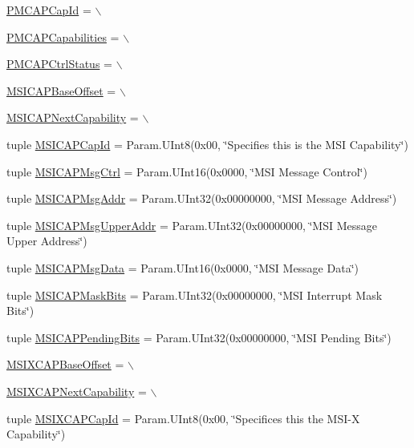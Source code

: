 \begin{DoxyCompactItemize}
\item 
\hyperlink{classPci_1_1PciDevice_a50cb70d7c57b998cb8197e3bdd838ba9}{PMCAPCapId} = $\backslash$
\item 
\hyperlink{classPci_1_1PciDevice_a8cd41ed12be15607f8e7662eb8d84ed6}{PMCAPCapabilities} = $\backslash$
\item 
\hyperlink{classPci_1_1PciDevice_a92b7f127f47b21d3ecc104d25671cf92}{PMCAPCtrlStatus} = $\backslash$
\item 
\hyperlink{classPci_1_1PciDevice_a24a1a0fd62afea203b5edac13b589797}{MSICAPBaseOffset} = $\backslash$
\item 
\hyperlink{classPci_1_1PciDevice_a4f1b67a85cdaf32ce2e152793bcae158}{MSICAPNextCapability} = $\backslash$
\item 
tuple \hyperlink{classPci_1_1PciDevice_a473ff2506f8dde521c6814195db00965}{MSICAPCapId} = Param.UInt8(0x00, \char`\"{}Specifies this is the MSI Capability\char`\"{})
\item 
tuple \hyperlink{classPci_1_1PciDevice_a8e794db7345ad700d23b46e9b7b7adcf}{MSICAPMsgCtrl} = Param.UInt16(0x0000, \char`\"{}MSI Message Control\char`\"{})
\item 
tuple \hyperlink{classPci_1_1PciDevice_ab1a9538764c92af9e4b58fa1889c816a}{MSICAPMsgAddr} = Param.UInt32(0x00000000, \char`\"{}MSI Message Address\char`\"{})
\item 
tuple \hyperlink{classPci_1_1PciDevice_aad615796a9eb2e4f0a7b23a6de466f5a}{MSICAPMsgUpperAddr} = Param.UInt32(0x00000000, \char`\"{}MSI Message Upper Address\char`\"{})
\item 
tuple \hyperlink{classPci_1_1PciDevice_aeb2bb99ab6d72270f3767fa2aa4dd4a5}{MSICAPMsgData} = Param.UInt16(0x0000, \char`\"{}MSI Message Data\char`\"{})
\item 
tuple \hyperlink{classPci_1_1PciDevice_ac70a7d07fb7c0b750913e1d74fb9edf8}{MSICAPMaskBits} = Param.UInt32(0x00000000, \char`\"{}MSI Interrupt Mask Bits\char`\"{})
\item 
tuple \hyperlink{classPci_1_1PciDevice_a1e551eca59d7e257c765befbfd09f569}{MSICAPPendingBits} = Param.UInt32(0x00000000, \char`\"{}MSI Pending Bits\char`\"{})
\item 
\hyperlink{classPci_1_1PciDevice_a07a507adc2b79cf78adec9662343f0fe}{MSIXCAPBaseOffset} = $\backslash$
\item 
\hyperlink{classPci_1_1PciDevice_a6a52f9ecc10f528668ebfaf713c55e2a}{MSIXCAPNextCapability} = $\backslash$
\item 
tuple \hyperlink{classPci_1_1PciDevice_ae90ae10699fd4e465796629b41df21bb}{MSIXCAPCapId} = Param.UInt8(0x00, \char`\"{}Specifices this the MSI-\/X Capability\char`\"{})

\end{DoxyCompactItemize}
